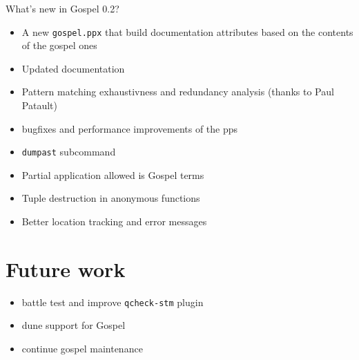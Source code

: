 \documentclass[pdf]{beamer}
\begin{document}
\begin{frame}{What's new in Gospel 0.2?}

  \begin{itemize}

    \item A new \texttt{gospel.ppx} that build documentation attributes based on the contents of the gospel ones
    \item Updated documentation
    \item Pattern matching exhaustivness and redundancy analysis (thanks to Paul Patault)
    \item bugfixes and performance improvements of the pps
    \item \texttt{dumpast} subcommand
    \item Partial application allowed is Gospel terms
    \item Tuple destruction in anonymous functions
    \item Better location tracking and error messages
  \end{itemize}

\end{frame}

\section{Future work}

\begin{frame}

  \begin{itemize}
    \item battle test and improve \texttt{qcheck-stm} plugin
    \item dune support for Gospel
    \item continue gospel maintenance
  \end{itemize}

\end{frame}
\end{document}
